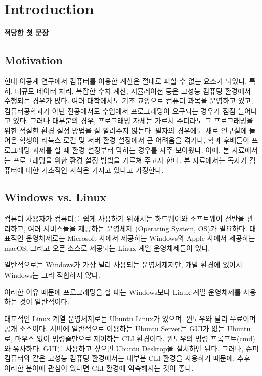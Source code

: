 \chapter{Introduction}

\graphicspath{{./chap1/images/}}   
\textbf{적당한 첫 문장}

\section{Motivation}
현대 이공계 연구에서 컴퓨터를 이용한 계산은 절대로 피할 수 없는 요소가 되었다. 특히, 대규모 데이터 처리, 복잡한 수치 계산, 시뮬레이션 등은 고성능 컴퓨팅 환경에서 수행되는 경우가 많다. 여러 대학에서도 기초 교양으로 컴퓨터 과목을 운영하고 있고, 컴퓨터공학과가 아닌 전공에서도 수업에서 프로그래밍이 요구되는 경우가 점점 늘어나고 있다. 그러나 대부분의 경우, 프로그래밍 자체는 가르쳐 주더라도 그 프로그래밍을 위한 적절한 환경 설정 방법을 잘 알려주지 않는다. 필자의 경우에도 새로 연구실에 들어온 학생이 리눅스 로컬 및 서버 환경 설정에서 큰 어려움을 겪거나, 학과 후배들이 프로그래밍 과제를 할 때 환경 설정부터 막히는 경우를 자주 보아왔다. 이에, 본 자료에서는 프로그래밍을 위한 환경 설정 방법을 가르쳐 주고자 한다. 본 자료에서는 독자가 컴퓨터에 대한 기초적인 지식은 가지고 있다고 가정한다. %

\section{Windows vs. Linux}

컴퓨터 사용자가 컴퓨터를 쉽게 사용하기 위해서는 하드웨어와 소프트웨어 전반을 관리하고, 여러 서비스들을 제공하는 운영체제 (Operating System, OS)가 필요하다. 대표적인 운영체제로는 Microsoft 사에서 제공하는 Windows와 Apple 사에서 제공하는 macOS, 그리고 오픈 소스로 제공되는 Linux 계열 운영체제들이 있다. 

일반적으로는 Windows가 가장 널리 사용되는 운영체제지만, 개발 환경에 있어서 Windows는 그리 적합하지 않다. 

이러한 이유 때문에 프로그래밍을 할 때는 Windows보다 Linux 계열 운영체제를 사용하는 것이 일반적이다.

대표적인 Linux 계열 운영체제로는 Ubuntu Linux가 있으며, 윈도우와 달리 무료이며 공개 소스이다. 서버에 일반적으로 이용하는 Ubuntu Server는 \acs{GUI}가 없는 Ubuntu로, 마우스 없이 명령줄만으로 제어하는 \acs{CLI} 환경이다. 윈도우의 명령 프롬프트(cmd)와 유사하다. GUI를 사용하고 싶으면 Ubuntu Desktop을 설치하면 된다. 그러나, 슈퍼컴퓨터와 같은 고성능 컴퓨팅 환경에서는 대부분 CLI 환경을 사용하기 때문에, 추후 이러한 분야에 관심이 있다면 CLI 환경에 익숙해지는 것이 좋다.

